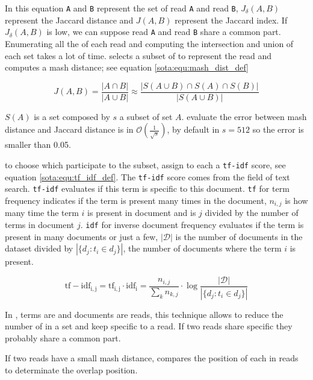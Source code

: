 \documentclass[main]{subfiles}
\begin{document}
In this equation \texttt{A} and \texttt{B} represent the \kmer set of read \texttt{A} and read \texttt{B}, $J_{\delta}(A,B)$ represent the Jaccard distance and $J(A,B)$ represent the Jaccard index. If $J_{\delta}(A,B)$ is low, we can suppose read \texttt{A} and read \texttt{B} share a common part.
Enumerating all the \kmers of each read and computing the intersection and union of each set takes a lot of time. \mhap selects a subset of \kmers to represent the read and computes a mash distance; \cite{mash_distance} see equation \ref{sota:equ:mash_dist_def} 

\begin{equation}
J(A,B) = \frac{|A \cap B|}{|A \cup B|} \approx \frac{|S(A \cup B) \cap S(A) \cap S(B)|}{|S(A \cup B)|}
\label{sota:equ:mash_dist_def}
\end{equation}

$S(A)$ is a \kmers set composed by $s$ a subset \kmers of set $A$. \citeauthor{mash_distance} evaluate the error between mash distance and Jaccard distance is in $\mathcal{O}(\frac{1}{\sqrt{s}})$, by default in \mhap $s=512$ so the error is smaller than 0.05.

\mhap to choose which \kmer participate to the subset, assign to each \kmer a \texttt{tf-idf} score, see equation \ref{sota:equ:tf_idf_def}. The \texttt{tf-idf} score comes from the field of text search. \texttt{tf-idf} evaluates if this term is specific to this document. \texttt{tf} for term frequency indicates if the term is present many times in the document, $n_{i,j}$ is how many time the term $i$ is present in document and is $j$ divided by the number of terms in document $j$. \texttt{idf} for inverse document frequency evaluates if the term is present in many documents or just a few, $|\mathcal{D}|$ is the number of documents in the dataset divided by $|\{d_{j}:t_{i}\in d_{j}\}|$, the number of documents where the term $i$ is present.

\begin{equation}
\mathrm{tf-idf_{i,j}} = \mathrm{tf_{i,j}} \cdot \mathrm{idf_{i}} = \frac{n_{i,j}}{\sum_{k}n_{k,j}} \cdot \log{\frac  {|\mathcal{D}|}{|\{d_{j}:t_{i}\in d_{j}\}|}}
\label{sota:equ:tf_idf_def}
\end{equation}

In \mhap, terms are \kmer and documents are reads, this technique allows to reduce the number of \kmer in a set and keep \kmer specific to a read. If two reads share specific \kmer they probably share a common part.

If two reads have a small mash distance, \mhap compares the position of each \kmer in reads to determinate the overlap position.
\end{document}
